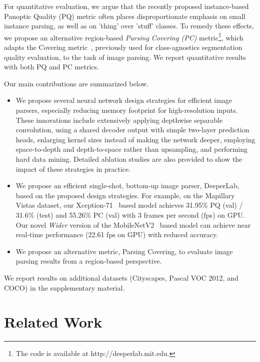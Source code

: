 \documentclass[10pt,twocolumn,letterpaper]{article}
\begin{document}
For quantitative evaluation, we argue that the recently proposed instance-based Panoptic Quality (PQ) metric \cite{kirillov2018panoptic} often places disproportionate emphasis on small instance parsing, as well as on 'thing' over 'stuff' classes. To remedy these effects, we propose an alternative region-based \emph{Parsing Covering (PC)} metric\footnote{The code is available at http://deeperlab.mit.edu.}, which adapts the Covering metric~\cite{amfm_pami2011}, previously used for class-agnostics segmentation quality evaluation, to the task of image parsing. We report quantitative results with both PQ and PC metrics.

Our main contributions are summarized below.
\begin{itemize}
    \item We propose several neural network design strategies for efficient image parsers, especially reducing memory footprint for high-resolution inputs. These innovations include extensively applying depthwise separable convolution, using a shared decoder output with simple two-layer prediction heads, enlarging kernel sizes instead of making the network deeper, employing space-to-depth and depth-to-space rather than upsampling, and performing hard data mining. Detailed ablation studies are also provided to show the impact of these strategies in practice.
    \item We propose an efficient single-shot, bottom-up image parser, DeeperLab, based on the proposed design strategies. For example, on the Mapillary Vistas dataset, our Xception-71~\cite{chollet2016xception,dai2017coco,deeplabv3plus2018} based model achieves 31.95\% PQ (val) / 31.6\% (test) and 55.26\% PC (val) with 3 frames per second (fps) on GPU. Our novel \emph{Wider} version of the MobileNetV2~\cite{howard2017mobilenets} based model can achieve near real-time performance (22.61 fps on GPU) with reduced accuracy.
    \item We propose an alternative metric, Parsing Covering, to evaluate image parsing results from a region-based perspective.
\end{itemize}
We report results on additional datasets (Cityscapes, Pascal VOC 2012, and COCO) in the supplementary material. 
\section{Related Work}
\label{sec:related_work}
\end{document}
